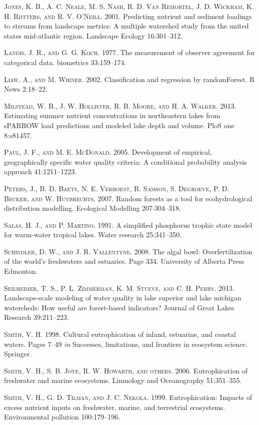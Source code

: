 \documentclass[11pt,]{article}
\begin{document}
\textsc{Jones, K. B., A. C. Neale, M. S. Nash, R. D. Van Remortel, J. D.
Wickham, K. H. Riitters, and R. V. O'Neill}. 2001. Predicting nutrient
and sediment loadings to streams from landscape metrics: A multiple
watershed study from the united states mid-atlantic region. Landscape
Ecology 16:301--312.

\textsc{Landis, J. R., and G. G. Koch}. 1977. The measurement of
observer agreement for categorical data. biometrics 33:159--174.

\textsc{Liaw, A., and M. Wiener}. 2002. Classification and regression by
randomForest. R News 2:18--22.

\textsc{Milstead, W. B., J. W. Hollister, R. B. Moore, and H. A.
Walker}. 2013. Estimating summer nutrient concentrations in northeastern
lakes from sPARROW load predictions and modeled lake depth and volume.
PloS one 8:e81457.

\textsc{Paul, J. F., and M. E. McDonald}. 2005. Development of
empirical, geographically specific water quality criteria: A conditional
probability analysis approach 41:1211--1223.

\textsc{Peters, J., B. D. Baets, N. E. Verhoest, R. Samson, S. Degroeve,
P. D. Becker, and W. Huybrechts}. 2007. Random forests as a tool for
ecohydrological distribution modelling. Ecological Modelling
207:304--318.

\textsc{Salas, H. J., and P. Martino}. 1991. A simplified phosphorus
trophic state model for warm-water tropical lakes. Water research
25:341--350.

\textsc{Schindler, D. W., and J. R. Vallentyne}. 2008. The algal bowl:
Overfertilization of the world's freshwaters and estuaries. Page 334.
University of Alberta Press Edmonton.

\textsc{Seilheimer, T. S., P. L. Zimmerman, K. M. Stueve, and C. H.
Perry}. 2013. Landscape-scale modeling of water quality in lake superior
and lake michigan watersheds: How useful are forest-based indicators?
Journal of Great Lakes Research 39:211--223.

\textsc{Smith, V. H.} 1998. Cultural eutrophication of inland,
estuarine, and coastal waters. Pages 7--49 \emph{in} Successes,
limitations, and frontiers in ecosystem science. Springer.

\textsc{Smith, V. H., S. B. Joye, R. W. Howarth, and others}. 2006.
Eutrophication of freshwater and marine ecosystems. Limnology and
Oceanography 51:351--355.

\textsc{Smith, V. H., G. D. Tilman, and J. C. Nekola}. 1999.
Eutrophication: Impacts of excess nutrient inputs on freshwater, marine,
and terrestrial ecosystems. Environmental pollution 100:179--196.
\end{document}
